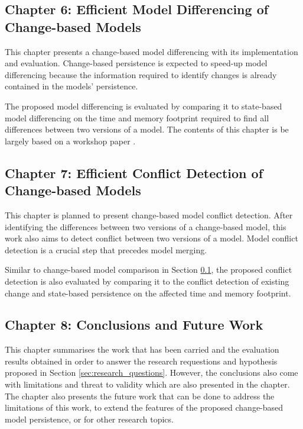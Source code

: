 \subsection{Chapter 6: Efficient Model Differencing of Change-based Models}
\label{sec:chapter_6_model_differencing}
This chapter presents a change-based model differencing with its implementation and evaluation. Change-based persistence is expected to speed-up model differencing because the information required to identify changes is already contained in the models' persistence. 

The proposed model differencing is evaluated by comparing it to state-based model differencing on the time and memory footprint required to find all differences between two versions of a model. The contents of this chapter is be largely based on a workshop paper \cite{yohannis2018efficient}.

\subsection{Chapter 7: Efficient Conflict Detection of Change-based Models}
\label{sec:chapter_7_conflict_detection}
This chapter is planned to present change-based model conflict detection. After identifying the differences between two versions of a change-based model, this work also aims to detect conflict between two versions of a model. Model conflict detection is a crucial step that precedes model merging.

Similar to change-based model comparison in Section \ref{sec:chapter_6_model_differencing}, the proposed conflict detection is also evaluated by comparing it to the conflict detection of existing change and state-based persistence on the affected time and memory footprint.

\subsection{Chapter 8: Conclusions and Future Work}
\label{sec:chapter_8_conclusions_and_future_work}
This chapter summarises the work that has been carried and the evaluation results obtained in order to answer the research requestions and hypothesis proposed in Section \ref{sec:research_questions}. However, the conclusions also come with limitations and threat to validity which are also presented in the chapter. The chapter also presents the future work that can be done to address the limitations of this work, to extend the features of the proposed change-based model persistence, or for other research topics.

